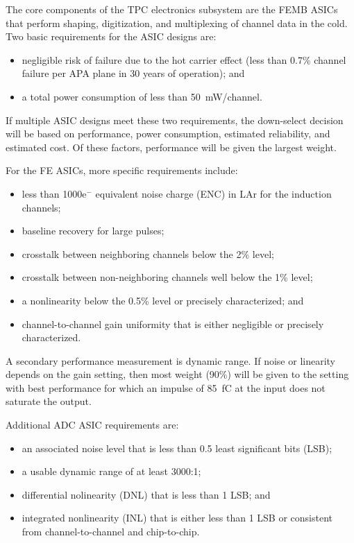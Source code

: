 The core components of the TPC electronics subsystem are the FEMB ASICs that perform shaping, digitization, and multiplexing of channel data in the cold.  Two basic requirements for the ASIC designs are:
\begin{itemize}
\item{negligible risk of failure due to the hot carrier effect (less than 0.7\% channel failure per APA plane in 30 years of operation); and}
\item{a total power consumption of less than 50~mW/channel.}
\end{itemize}
If multiple ASIC designs meet these two requirements, the down-select decision will be based on performance, power consumption, estimated reliability, and estimated cost.  Of these factors, performance will be given the largest weight.

For the FE ASICs, more specific requirements include:
\begin{itemize}
\item{less than 1000e$^-$ equivalent noise charge (ENC) in LAr for the induction channels;}
\item{baseline recovery for large pulses;}
\item{crosstalk between neighboring channels below the 2\% level;}
\item{crosstalk between non-neighboring channels well below the 1\% level;}
\item{a nonlinearity below the 0.5\% level or precisely characterized; and}
\item{channel-to-channel gain uniformity that is either negligible or precisely characterized.}
\end{itemize}
A secondary performance measurement is dynamic range.  If noise or linearity depends on the gain setting, then most weight (90\%) will be given to the setting with best performance for which an impulse of 85~fC at the input does not saturate the output.

Additional ADC ASIC requirements are:
\begin{itemize}
\item{an associated noise level that is less than 0.5 least significant bits (LSB);}
\item{a usable dynamic range of at least 3000:1;}
\item{differential nolinearity (DNL) that is less than 1 LSB; and}
\item{integrated nonlinearity (INL) that is either less than 1 LSB or consistent from channel-to-channel and chip-to-chip.}
\end{itemize}

